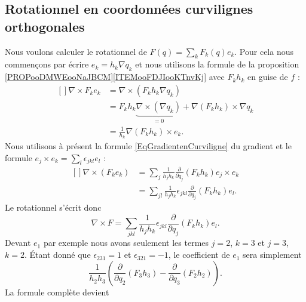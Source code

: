 \subsection{Rotationnel en coordonnées curvilignes orthogonales}

Nous voulons calculer le rotationnel de \( F(q)=\sum_kF_k(q)e_k\). Pour cela nous commençons par écrire \( e_k=h_k\nabla q_k\) et nous utilisons la formule de la proposition \ref{PROPooDMWEooNaJBCM}\ref{ITEMooFDJIooKTnvKj} avec \( F_kh_k\) en guise de \( f\) :
\begin{equation}
	\begin{aligned}[]
		\nabla\times F_ke_k & =\nabla\times(F_kh_k\nabla q_k)                                                  \\
		                    & =F_kh_k\underbrace{\nabla\times(\nabla q_k)}_{=0}+\nabla(F_kh_k)\times\nabla q_k \\
		                    & =\frac{1}{ h_k }\nabla(F_kh_k)\times e_k.
	\end{aligned}
\end{equation}
Nous utilisons à présent la formule \eqref{EqGradientenCurviligne} du gradient et le formule \( e_j\times e_k=\sum_l\epsilon_{jkl}e_l\) :
\begin{equation}
	\begin{aligned}[]
		\nabla\times(F_ke_k) & =\sum_{j}\frac{1}{ h_jh_k }\frac{ \partial  }{ \partial q_j }(F_kh_k)e_j\times e_k       \\
		                     & =\sum_{jl}\frac{1}{ h_jh_k }\epsilon_{jkl}\frac{ \partial  }{ \partial q_j }(F_kh_k)e_l.
	\end{aligned}
\end{equation}
Le rotationnel s'écrit donc
\begin{equation}
	\nabla\times F=\sum_{jkl}\frac{1}{ h_jh_k }\epsilon_{jkl}\frac{ \partial  }{ \partial q_j }(F_kh_k)e_l.
\end{equation}
Devant \( e_1\) par exemple nous avons seulement les termes \( j=2\), \( k=3\) et \( j=3\), \( k=2\). Étant donné que \( \epsilon_{231}=1\) et \( \epsilon_{321}=-1\), le coefficient de \( e_1\) sera simplement
\begin{equation}
	\frac{1}{ h_2h_3 }\left( \frac{ \partial  }{ \partial q_2 }(F_3h_3)-\frac{ \partial  }{ \partial q_3 }(F_2h_2) \right).
\end{equation}
La formule complète devient
